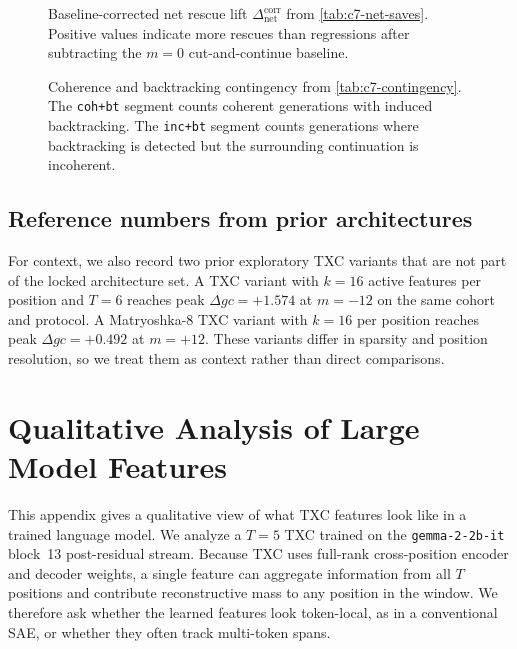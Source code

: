 \begin{figure}[t]
    \centering
    \caption{Baseline-corrected net rescue lift $\Delta_{\text{net}}^{\text{corr}}$ from \cref{tab:c7-net-saves}. Positive values indicate more rescues than regressions after subtracting the $m=0$ cut-and-continue baseline.}
    \label{fig:c7-net-saves}
\end{figure}

\begin{figure}[t]
    \centering
    \caption{Coherence and backtracking contingency from \cref{tab:c7-contingency}. The \texttt{coh+bt} segment counts coherent generations with induced backtracking. The \texttt{inc+bt} segment counts generations where backtracking is detected but the surrounding continuation is incoherent.}
    \label{fig:c7-contingency}
\end{figure}



\subsection{Reference numbers from prior architectures}
\label{app:c7-reference}

For context, we also record two prior exploratory TXC variants that are not part of the locked architecture set. A TXC variant with $k=16$ active features per position and $T=6$ reaches peak $\Delta gc=+1.574$ at $m=-12$ on the same cohort and protocol. A Matryoshka-8 TXC variant with $k=16$ per position reaches peak $\Delta gc=+0.492$ at $m=+12$. These variants differ in sparsity and position resolution, so we treat them as context rather than direct comparisons.

\section{Qualitative Analysis of Large Model Features}
\label{app:meta-autointerp}

This appendix gives a qualitative view of what TXC features look like in a trained language model. We analyze a $T=5$ TXC trained on the \texttt{gemma-2-2b-it} block~13 post-residual stream. Because TXC uses full-rank cross-position encoder and decoder weights, a single feature can aggregate information from all $T$ positions and contribute reconstructive mass to any position in the window. We therefore ask whether the learned features look token-local, as in a conventional SAE, or whether they often track multi-token spans.

